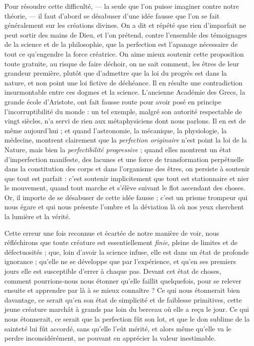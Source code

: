 \documentclass[a4paper, 11pt, oneside]{article}
\begin{document}
Pour résoudre cette difficulté, --- la seule que l'on puisse imaginer contre notre théorie, --- il faut d'abord se désabuser d'une idée fausse que l'on se fait généralement sur les créations divines. On a dit et répété que rien d'imparfait ne peut sortir des mains de Dieu, et l'on prétend, contre l'ensemble des témoignages de la science et de la philosophie, que la perfection est l'apanage nécessaire de tout ce qu'engendre la force créatrice. On aime mieux soutenir cette proposition toute gratuite, au risque de faire déchoir, on ne sait comment, les êtres de leur grandeur première, plutôt que d'admettre que la loi du progrès est dans la nature, et non point une loi fictive de déchéance. Il en résulte une contradiction insurmontable entre ces dogmes et la science. L'ancienne Académie des Grecs, la grande école d'Aristote, ont fait fausse route pour avoir posé en principe l'incorruptibilité du monde : un tel exemple, malgré son autorité respectable de vingt siècles, n'a servi de rien aux métaphysiciens dont nous parlons. Il en est de même aujourd'hui ; et quand l'astronomie, la mécanique, la physiologie, la médecine, montrent clairement que la \emph{perfection originaire} n'est point la loi de la Nature, mais bien la \emph{perfectibilité progressive} ; quand elles montrent un état d'imperfection manifeste, des lacunes et une force de transformation perpétuelle dans la constitution des corps et dans l'organisme des êtres, on persiste à soutenir que tout est parfait : c'est soutenir implicitement que tout est stationnaire et nier le mouvement, quand tout marche et s'élève suivant le flot ascendant des choses. Or, il importe de se désabuser de cette idée fausse ; c'est un prisme trompeur qui nous égare et qui nous présente l'ombre et la déviation là où nos yeux cherchent la lumière et la vérité.

Cette erreur une fois reconnue et écartée de notre manière de voir, nous réfléchirons que toute créature est essentiellement \emph{finie}, pleine de limites et de défectuosités ; que, loin d'avoir la science infuse, elle est dans un état de profonde ignorance ; qu'elle ne se développe que par l'expérience, et qu'en ses premiers jours elle est susceptible d'errer à chaque pas. Devant cet état de choses, comment pourrions-nous nous étonner qu'elle faillit quelquefois, pour se relever ensuite et apprendre par là à se mieux connaître ? Ce qui nous étonnerait bien davantage, ce serait qu'en son état de simplicité et de faiblesse primitives, cette jeune créature marchât à grands pas loin du berceau où elle a reçu le jour. Ce qui nous étonnerait, ce serait que la perfection fût son lot, et que le don sublime de la sainteté lui fût accordé, sans qu'elle l'eût mérité, et alors même qu'elle va le perdre inconsidérément, ne pouvant en apprécier la valeur inestimable.
\end{document}
